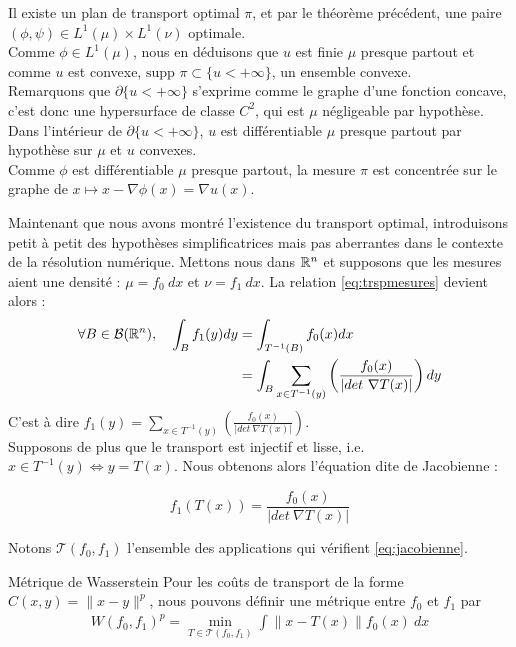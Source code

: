 \documentclass[a4paper,12pt]{article}
\newcommand{\supp}{\text{supp }}
\begin{document}
\begin{preuve}
Il existe un plan de transport optimal $\pi$, et par le théorème précédent, une paire $(\phi,\psi)\in L^1(\mu)\times L^1(\nu)$ optimale. \\
Comme $\phi\in L^1(\mu)$, nous en déduisons que $u$ est finie $\mu$ presque partout et comme $u$ est convexe, $\supp\pi\subset \{u<+\infty\}$, un ensemble convexe.\\
Remarquons que $\partial \{u<+\infty\}$ s'exprime comme le graphe d'une fonction concave, c'est donc une hypersurface de classe $C^2$, qui est $\mu$ négligeable par hypothèse. Dans l'intérieur de $\partial \{u<+\infty\}$, $u$ est différentiable $\mu$ presque partout par hypothèse sur $\mu$ et $u$ convexes. \\
Comme $\phi$ est différentiable $\mu$ presque partout, la mesure $\pi$ est concentrée sur le graphe de $x\mapsto x-\nabla\phi(x)=\nabla u(x)$.
\end{preuve}



 

\newpage


Maintenant que nous avons montré l'existence du transport optimal, introduisons petit à petit des hypothèses simplificatrices mais pas aberrantes dans le contexte de la résolution numérique. Mettons nous dans $\mathbb{R}^n$ et supposons que les mesures aient une densité : $\mu = f_0\ dx$ et $\nu = f_1\ dx$. La relation \eqref{eq:trspmesures} devient alors : 
\begin{align*}
\forall B \in\mathcal{B}(\mathbb{R}^n),\quad \int_B f_1(y)dy&=\int_{T^{-1}(B)} f_0(x) dx \\
&= \int_B \sum_{x\in T^{-1}(y)} \left(\frac{f_0(x)}{|det\ \nabla T(x)|}\right)dy\\
\end{align*}
C'est à dire $f_1(y) = \sum_{x\in T^{-1}(y)} \left(\frac{f_0(x)}{|det\ \nabla T(x)|}\right)$.\\
Supposons de plus que le transport est injectif et lisse, i.e. $x\in T^{-1}(y) \Leftrightarrow y=T(x)$. Nous obtenons alors l'équation dite de Jacobienne :
 
\begin{equation}
\tag{J}
f_1(T(x)) = \frac{f_0(x)}{|det\ \nabla T(x)|}
\label{eq:jacobienne}
\end{equation}


Notons $\mathcal{T}(f_0,f_1)$ l'ensemble des applications qui vérifient \eqref{eq:jacobienne}.
\begin{definition}{Métrique de Wasserstein}
Pour les coûts de transport de la forme $C(x,y) = \|x - y\|^p$, nous pouvons définir une métrique entre $f_0$ et $f_1$ par
\begin{align*}
W(f_0,f_1)^p=\min_{T\in\mathcal{T}(f_0,f_1)} \int \|x-T(x)\|f_0(x)\ dx
\end{align*} 

\end{definition}
\end{document}

